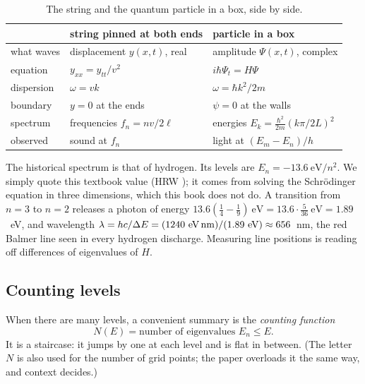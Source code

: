 \begin{table}[htbp]\centering
\caption{The string and the quantum particle in a box, side by side.}
\label{tab:schrodinger-analogy}
\begin{tabular}{lll}
\toprule
 & string pinned at both ends & particle in a box \\
\midrule
what waves & displacement $y(x,t)$, real & amplitude $\Psi(x,t)$, complex \\
equation & $y_{xx}=y_{tt}/v^2$ & $i\hbar\Psi_t=H\Psi$ \\
dispersion & $\omega=vk$ & $\omega=\hbar k^2/2m$ \\
boundary & $y=0$ at the ends & $\psi=0$ at the walls \\
spectrum & frequencies $f_n=nv/2\ell$ & energies $E_k=\frac{\hbar^2}{2m}(k\pi/2L)^2$ \\
observed & sound at $f_n$ & light at $(E_m-E_n)/h$ \\
\bottomrule
\end{tabular}
\end{table}

The historical spectrum is that of hydrogen. Its levels are $E_n=-13.6~\text{eV}/n^2$. We simply quote this textbook value (HRW \cite{hrw}); it comes from solving the Schr\"odinger equation in three dimensions, which this book does not do. A transition from $n=3$ to $n=2$ releases a photon of energy $13.6\left(\frac14-\frac19\right)~\text{eV}=13.6\cdot\frac5{36}~\text{eV}=1.89$~eV, and wavelength $\lambda=hc/\Delta E=(1240~\text{eV\,nm})/(1.89~\text{eV})\approx656$~nm, the red Balmer line seen in every hydrogen discharge. Measuring line positions is reading off differences of eigenvalues of $H$.

\subsection{Counting levels}

When there are many levels, a convenient summary is the \emph{counting function}
\begin{equation}
N(E)=\text{number of eigenvalues }E_n\le E.
\label{eq:schrodinger-count}
\end{equation}
It is a staircase: it jumps by one at each level and is flat in between. (The letter $N$ is also used for the number of grid points; the paper overloads it the same way, and context decides.)

